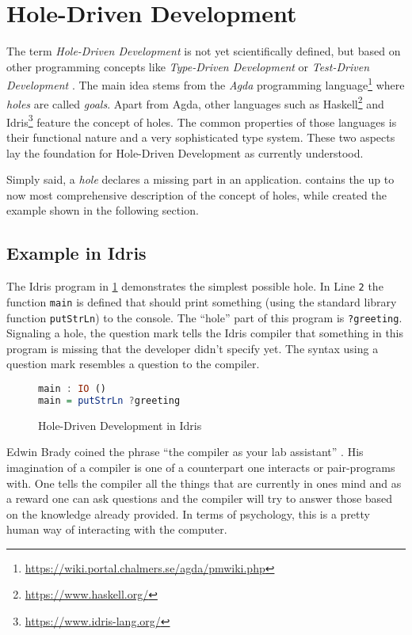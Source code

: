 \section{Hole-Driven Development}
\label{sec:hole-driven-development}
The term \emph{Hole-Driven Development} is not yet scientifically defined, but based on other programming concepts like \emph{Type-Driven Development} \autocite{brady_type-driven_2017} or \emph{Test-Driven Development} \autocite{mccracken_digital_1957}.
The main idea stems from the \emph{Agda} programming language\footnote{\url{https://wiki.portal.chalmers.se/agda/pmwiki.php}} where \emph{holes} are called \emph{goals}.
Apart from Agda, other languages such as Haskell\footnote{\url{https://www.haskell.org/}} and Idris\footnote{\url{https://www.idris-lang.org/}} feature the concept of holes.
The common properties of those languages is their functional nature and a very sophisticated type system.
These two aspects lay the foundation for Hole-Driven Development as currently understood.

Simply said, a \emph{hole} declares a missing part in an application.
\textcite{gamari_haskell_2019} contains the up to now most comprehensive description of the concept of holes, while \textcite{brady_type-driven_2017} created the example shown in the following section.

\subsection{Example in Idris}
\label{sub:hole-driven-development-in-idris}
The Idris program in \cref{fig:idris-program-hole} demonstrates the simplest possible hole.
In Line \verb|2| the function \verb|main| is defined that should print something (using the standard library function \verb|putStrLn|) to the console.
The ``hole'' part of this program is \verb|?greeting|.
Signaling a hole, the question mark tells the Idris compiler that something in this program is missing that the developer didn't specify yet.
The syntax using a question mark resembles a question to the compiler.

\begin{figure}[h!]
\begin{lstlisting}[language=Haskell,firstnumber=1]
main : IO ()
main = putStrLn ?greeting
\end{lstlisting}
\caption{Hole-Driven Development in Idris}
\label{fig:idris-program-hole}
\end{figure}

Edwin Brady coined the phrase ``the compiler as your lab assistant'' \autocite{brady_type-driven_2017}.
His imagination of a compiler is one of a counterpart one interacts or pair-programs with.
One tells the compiler all the things that are currently in ones mind and as a reward one can ask questions and the compiler will try to answer those based on the knowledge already provided.
In terms of psychology, this is a pretty human way of interacting with the computer.

